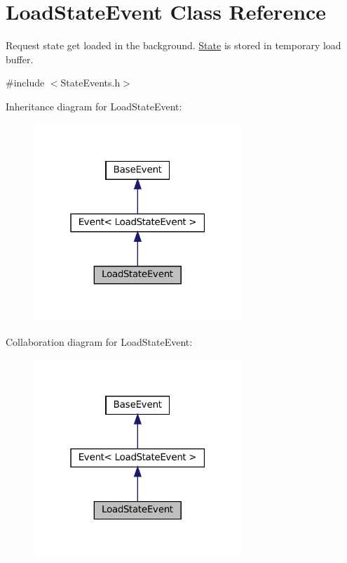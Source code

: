 \hypertarget{classLoadStateEvent}{}\section{Load\+State\+Event Class Reference}
\label{classLoadStateEvent}


Request state get loaded in the background. \hyperlink{classState}{State} is stored in temporary load buffer.  




{\ttfamily \#include $<$State\+Events.\+h$>$}



Inheritance diagram for Load\+State\+Event\+:
\nopagebreak
\begin{figure}[H]
\begin{center}
\leavevmode
\includegraphics[width=223pt]{classLoadStateEvent__inherit__graph}
\end{center}
\end{figure}


Collaboration diagram for Load\+State\+Event\+:
\nopagebreak
\begin{figure}[H]
\begin{center}
\leavevmode
\includegraphics[width=223pt]{classLoadStateEvent__coll__graph}
\end{center}
\end{figure}
